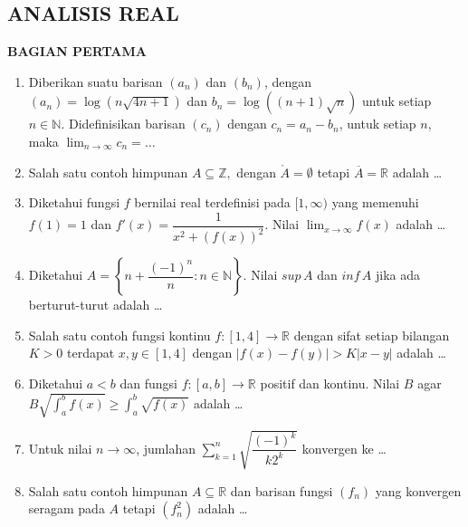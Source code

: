 \documentclass[12pt,twoside]{article}
\begin{document}
\subsection{ANALISIS REAL}
\textbf{BAGIAN PERTAMA}
\begin{enumerate}
	\item Diberikan suatu barisan $(a_n)$ dan $(b_n)$, dengan $(a_n) = \log (n\sqrt{4n+1})$ dan $b_n = \log ((n+1)\sqrt{n})$ untuk setiap $n \in \mathbb{N}$. Didefinisikan barisan $(c_n)$ dengan $c_n = a_n - b_n$, untuk setiap $n$, maka $\displaystyle\lim_{n \to \infty} c_n = \dots$

	\item Salah satu contoh himpunan $A \subseteq \mathbb{Z},$ dengan $\mathring{A} = \emptyset$ tetapi $\overline{A} = \mathbb{R}$ adalah \dots

	\item Diketahui fungsi $f$ bernilai real terdefinisi pada $[1,\infty)$ yang memenuhi $f(1)=1$ dan $f'(x)= \dfrac{1}{x^2 + (f(x))^2}$. Nilai $\displaystyle \lim_{x \to \infty} f(x)$ adalah \dots

	\item Diketahui $A = \left\lbrace n + \dfrac{(-1)^n}{n} : n \in \mathbb{N} \right\rbrace$. Nilai $sup\,A$ dan $inf\,A$ jika ada berturut-turut adalah \dots

	\item Salah satu contoh fungsi kontinu $f:[1,4] \to \mathbb{R}$ dengan sifat setiap bilangan $K>0$ terdapat $x,y \in [1,4]$ dengan $|f(x)-f(y)| > K|x-y|$ adalah \dots

	\item Diketahui $a < b$ dan fungsi $f : [a,b] \to \mathbb{R}$ positif dan kontinu. Nilai $B$ agar $B\displaystyle \sqrt{\int_{a}^{b} f(x)} \geq \int_{a}^{b} \sqrt{f(x)}$ adalah \dots

	\item Untuk nilai $n \to \infty$, jumlahan $\displaystyle \sum_{k=1}^{n} \sqrt{\dfrac{(-1)^k}{k2^k}} $ konvergen ke \dots

	\item Salah satu contoh himpunan $A \subseteq \mathbb{R}$ dan barisan fungsi $(f_n)$ yang konvergen seragam pada $A$ tetapi $(f^2_n)$ adalah \dots

\end{enumerate}
\end{document}

